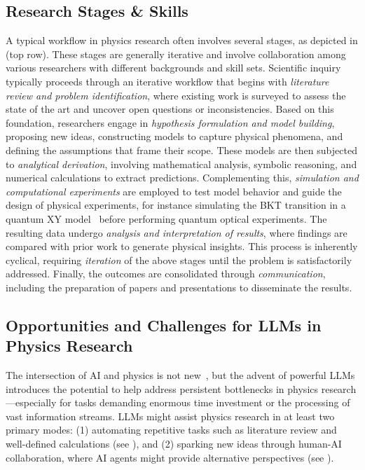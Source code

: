 \subsection{Research Stages \& Skills}
\label{sec:workflow_example}
A typical workflow in physics research often involves several stages, as depicted in  (top row). These stages are generally iterative and involve collaboration among various researchers with different backgrounds and skill sets.
Scientific inquiry typically proceeds through an iterative workflow that begins with \textit{literature review and problem identification}, where existing work is surveyed to assess the state of the art and uncover open questions or inconsistencies. Based on this foundation, researchers engage in \textit{hypothesis formulation and model building}, proposing new ideas, constructing models to capture physical phenomena, and defining the assumptions that frame their scope. These models are then subjected to \textit{analytical derivation}, involving mathematical analysis, symbolic reasoning, and numerical calculations to extract predictions. Complementing this, \textit{simulation and computational experiments} are employed to test model behavior and guide the design of physical experiments, for instance simulating the BKT transition in a quantum XY model~\cite{Ding1990KosterlitzThouless} before performing quantum optical experiments. The resulting data undergo \textit{analysis and interpretation of results}, where findings are compared with prior work to generate physical insights. This process is inherently cyclical, requiring \textit{iteration} of the above stages until the problem is satisfactorily addressed. Finally, the outcomes are consolidated through \textit{communication}, including the preparation of papers and presentations to disseminate the results.

\subsection{Opportunities and Challenges for LLMs in Physics Research}
\label{sec:llm_opportunies}
The intersection of AI and physics is not new~\cite{Carleo2019Machine}, but the advent of powerful LLMs introduces the potential to help address persistent bottlenecks in physics research---especially for tasks demanding enormous time investment or the processing of vast information streams.
LLMs might assist physics research in at least two primary modes: (1) automating repetitive tasks such as literature review and well-defined calculations (see ), and (2) sparking new ideas through human-AI collaboration, where AI agents might provide alternative perspectives (see ).

